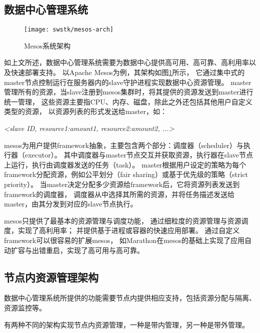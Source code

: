 

\subsection{数据中心管理系统}

\begin{figure}[tb]
  \centering
  \texttt{[image: swstk/mesos-arch]}
  \caption{Mesos系统架构}
  \label{fig:mesos-arch}
\end{figure}

如上文所述，数据中心管理系统需要为数据中心提供高可用、高可靠、高利用率以及快速部署支持。
以Apache Mesos\cite{}为例，其架构如图\ref{fig:mesos-arch}所示，
它通过集中式的master节点控制运行在服务器内的slave守护进程实现数据中心资源管理。
master管理所有的资源，当slave注册到mesos集群时，将其提供的资源发送到master进行统一管理，
这些资源主要指CPU、内存、磁盘，除此之外还包括其他用户自定义类型的资源，
以资源列表的形式发送给master，如：

\textit{<slave ID, resource1:amount1, resource2:amount2, ...>}

mesos为用户提供framework抽象，主要包含两个部分：调度器（scheduler）与执行器（executor）。
其中调度器与master节点交互并获取资源，执行器在slave节点上运行，执行由调度器发送的任务（task）。
master根据用户设定的策略为每个framework分配资源，例如公平划分（fair sharing）或基于优先级的策略（strict priority）。
当master决定分配多少资源给framework后，它将资源列表发送到framework的调度器，
调度器从中选择其所需的资源，并将任务描述发送给master，由其分发到对应的slave节点执行。

mesos只提供了最基本的资源管理与调度功能，
通过细粒度的资源管理与资源调度，实现了高利用率；
并提供基于进程或容器的快速应用部署。
通过自定义framework可以很容易的扩展mesos，
如Marathon\cite{}在mesos的基础上实现了应用自动扩容与出错重启，实现了高可用与高可靠。


\subsection{节点内资源管理架构}

数据中心管理系统所提供的功能需要节点内提供相应支持，包括资源分配与隔离、资源监控等。

有两种不同的架构实现节点内资源管理，一种是带内管理，另一种是带外管理。

